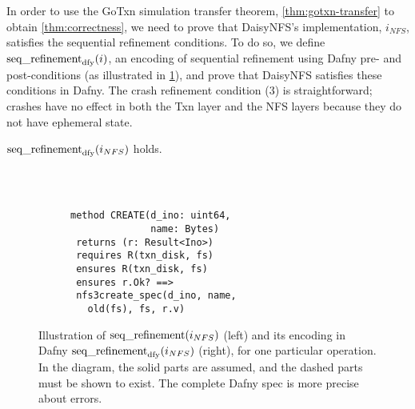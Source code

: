 In order to use the GoTxn simulation transfer theorem, \cref{thm:gotxn-transfer} to obtain \cref{thm:correctness}, we need to
prove that DaisyNFS's implementation, $i_{NFS}$, satisfies the sequential refinement conditions. To do so, we define
$\operatorname{seq\_refinement}_{\mathrm{dfy}}(i)$, an encoding of sequential refinement
using Dafny pre- and post-conditions (as illustrated in \cref{fig:refinement}), and prove that DaisyNFS
satisfies these conditions in Dafny. The crash refinement condition (3) is
straightforward; crashes have no effect in both the Txn layer and the NFS layers
because they do not have ephemeral state.

\begin{theorem} $\operatorname{seq\_refinement}_{\mathrm{dfy}}(i_{NFS})$ holds.
  \label{thm:dafny}
\end{theorem}

\begin{figure}
  \centering
  \begin{subfigure}{0.25\textwidth}
    
  \end{subfigure}~~~\vrule~~~~%
\begin{subfigure}{0.3\textwidth}
  {\small
\begin{verbatim}

method CREATE(d_ino: uint64,
              name: Bytes)
 returns (r: Result<Ino>)
 requires R(txn_disk, fs)
 ensures R(txn_disk, fs)
 ensures r.Ok? ==>
 nfs3create_spec(d_ino, name,
   old(fs), fs, r.v)
\end{verbatim}
}
\end{subfigure}
  \caption[Illustration of sequential refinement and its Dafny encoding]%
  {Illustration of $\operatorname{seq\_refinement}(i_{NFS})$ (left) and its encoding
in Dafny $\operatorname{seq\_refinement}_{\mathrm{dfy}}(i_{NFS})$ (right), for one particular operation.
In the diagram, the solid parts are assumed, and the
dashed parts must be shown to exist. The complete Dafny spec is more precise about
errors.}
  \label{fig:refinement}
\end{figure}

